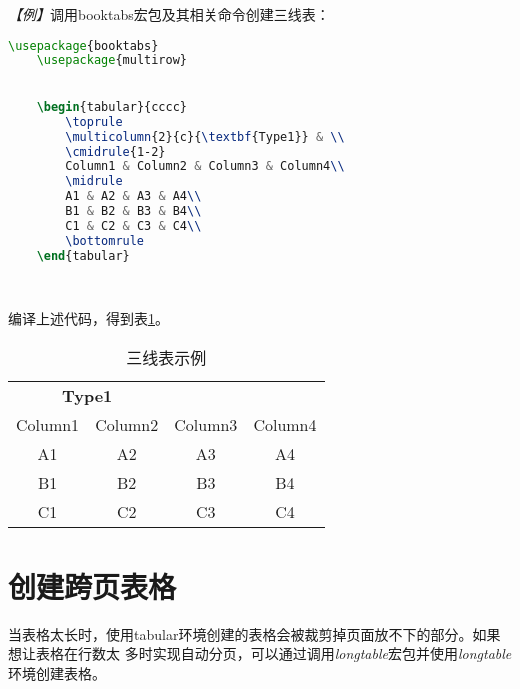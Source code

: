 \emph{【例】}调用booktabs宏包及其相关命令创建三线表：
\begin{lstlisting}[language=TeX]
    \usepackage{booktabs}
    \usepackage{multirow}
    

    \begin{tabular}{cccc}
        \toprule
        \multicolumn{2}{c}{\textbf{Type1}} & \\
        \cmidrule{1-2}
        Column1 & Column2 & Column3 & Column4\\
        \midrule
        A1 & A2 & A3 & A4\\
        B1 & B2 & B3 & B4\\
        C1 & C2 & C3 & C4\\
        \bottomrule
    \end{tabular}

    
\end{lstlisting}

编译上述代码，得到表\ref{tb561}。

\begin{table}[h]
    \centering
    \begin{tabular}{cccc}
        \toprule
        \multicolumn{2}{c}{\textbf{Type1}} &                             \\
        \cmidrule{1-2}
        Column1                            & Column2 & Column3 & Column4 \\
        \midrule
        A1                                 & A2      & A3      & A4      \\
        B1                                 & B2      & B3      & B4      \\
        C1                                 & C2      & C3      & C4      \\
        \bottomrule
    \end{tabular}
    \caption{三线表示例}
    \label{tb561}
\end{table}

\section{创建跨页表格}

当表格太长时，使用tabular环境创建的表格会被裁剪掉页面放不下的部分。如果想让表格在行数太
多时实现自动分页，可以通过调用\emph{longtable}宏包并使用\emph{longtable}环境创建表格。

